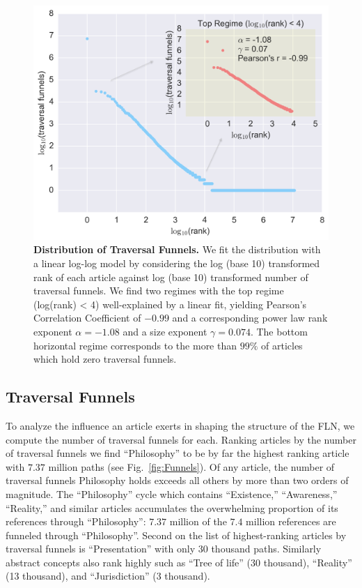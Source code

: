 \begin{figure}[tp!]
  \includegraphics[width=\columnwidth]{graphics/funnels_distribution.png}
  \caption{
    \textbf{Distribution of Traversal Funnels.}
We fit the distribution with a linear log-log model by considering the log (base 10) transformed rank of each article against log (base 10) transformed number of traversal funnels. 
We find two regimes with the top regime (log(rank) < 4) 
well-explained by a linear fit, yielding Pearson's 
Correlation Coefficient of $-0.99$ and a 
corresponding power law rank exponent $\alpha = -1.08$
and a size exponent $\gamma = 0.074$. 
The bottom horizontal regime corresponds to the more than $99\%$ of articles
which hold zero traversal funnels.}
  \label{fig:Funnels Distribution}
\end{figure}

\subsection{Traversal Funnels}
\label{Traversal Funnels}

To analyze the influence an article exerts in shaping the 
structure of the FLN, we compute the number of traversal funnels for each.
Ranking articles by the number of traversal funnels we find 
``Philosophy'' to be by far the highest ranking article with 
$7.37$ million paths
(see Fig.~\ref{fig:Funnels}).
Of any article, the number of traversal funnels Philosophy holds exceeds 
all others by more than two orders of magnitude.
The ``Philosophy'' cycle which contains ``Existence,'' ``Awareness,'' ``Reality,'' 
and similar articles accumulates the overwhelming proportion of its 
references through ``Philosophy'': $7.37$ million of the $7.4$ million references
are funneled through ``Philosophy''.
Second on the list of highest-ranking articles by traversal funnels is 
``Presentation'' with only $30$ thousand paths. Similarly abstract 
concepts also rank highly such as ``Tree of life'' (30 thousand), 
``Reality'' (13 thousand), and ``Jurisdiction'' (3 thousand).

